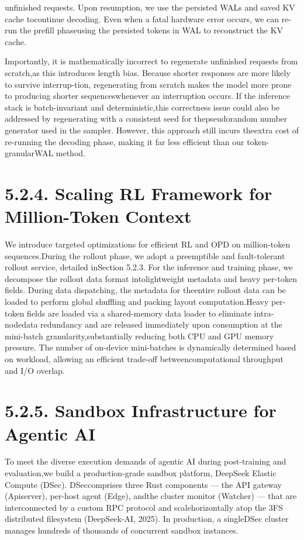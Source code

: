 \documentclass[
  10
]{article}
\begin{document}
unfinished requests. Upon resumption, we use the persisted WALs and
saved KV cache tocontinue decoding. Even when a fatal hardware error
occurs, we can re-run the prefill phaseusing the persisted tokens in WAL
to reconstruct the KV cache.

Importantly, it is mathematically incorrect to regenerate unfinished
requests from scratch,as this introduces length bias. Because shorter
responses are more likely to survive interrup-tion, regenerating from
scratch makes the model more prone to producing shorter
sequenceswhenever an interruption occurs. If the inference stack is
batch-invariant and deterministic,this correctness issue could also be
addressed by regenerating with a consistent seed for thepseudorandom
number generator used in the sampler. However, this approach still
incurs theextra cost of re-running the decoding phase, making it far
less efficient than our token-granularWAL method.

\section{5.2.4. Scaling RL Framework for Million-Token
Context}\label{scaling-rl-framework-for-million-token-context}

We introduce targeted optimizations for efficient RL and OPD on
million-token sequences.During the rollout phase, we adopt a preemptible
and fault-tolerant rollout service, detailed inSection 5.2.3. For the
inference and training phase, we decompose the rollout data format
intolightweight metadata and heavy per-token fields. During data
dispatching, the metadata for theentire rollout data can be loaded to
perform global shuffling and packing layout computation.Heavy per-token
fields are loaded via a shared-memory data loader to eliminate
intra-nodedata redundancy and are released immediately upon consumption
at the mini-batch granularity,substantially reducing both CPU and GPU
memory pressure. The number of on-device mini-batches is dynamically
determined based on workload, allowing an efficient trade-off
betweencomputational throughput and I/O overlap.

\section{5.2.5. Sandbox Infrastructure for Agentic
AI}\label{sandbox-infrastructure-for-agentic-ai}

To meet the diverse execution demands of agentic AI during post-training
and evaluation,we build a production-grade sandbox platform, DeepSeek
Elastic Compute (DSec). DSeccomprises three Rust components --- the API
gateway (Apiserver), per-host agent (Edge), andthe cluster monitor
(Watcher) --- that are interconnected by a custom RPC protocol and
scalehorizontally atop the 3FS distributed filesystem (DeepSeek-AI,
2025). In production, a singleDSec cluster manages hundreds of thousands
of concurrent sandbox instances.
\end{document}
